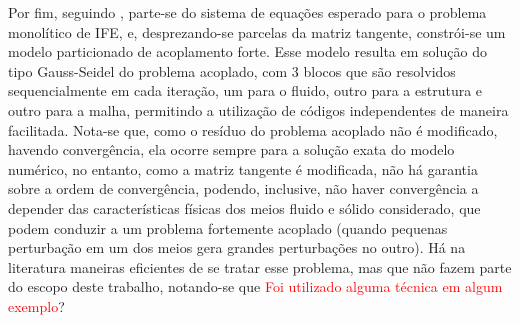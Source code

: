 
Por fim, seguindo , parte-se do sistema de equações esperado para o problema monolítico de IFE, e, desprezando-se parcelas da matriz tangente, constrói-se um modelo particionado de acoplamento forte. Esse modelo resulta em solução do tipo Gauss-Seidel do problema acoplado, com 3 blocos que são resolvidos sequencialmente em cada iteração, um para o fluido, outro para a estrutura e outro para a malha, permitindo a utilização de códigos independentes de maneira facilitada. Nota-se que, como o resíduo do problema acoplado não é modificado, havendo convergência, ela ocorre sempre para a solução exata do modelo numérico, no entanto, como a matriz tangente é modificada, não há garantia sobre a ordem de convergência, podendo, inclusive, não haver convergência a depender das características físicas dos meios fluido e sólido considerado, que podem conduzir a um problema fortemente acoplado (quando pequenas perturbação em um dos meios gera grandes perturbações no outro). Há na literatura maneiras eficientes de se tratar esse problema, mas que não fazem parte do escopo deste trabalho, notando-se que \textcolor{red}{Foi utilizado alguma técnica em algum exemplo}?

